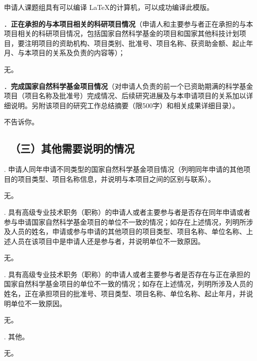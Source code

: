 \documentclass[12pt,UTF8,AutoFakeBold=2,a4paper]{ctexart} %
\newcommand{\sihao}{\fontsize{14pt}{\baselineskip}\selectfont}
\begin{document}
申请人课题组具有可以编译 \LaTeX 的计算机，可以成功编译此模版。

{\sihao \color{MsBlue} ．{\bfseries 正在承担的与本项目相关的科研项目情况}（申请人和主要参与者正在承担的与本项目相关的科研项目情况，包括国家自然科学基金的项目和国家其他科技计划项目，要注明项目的资助机构、项目类别、批准号、项目名称、获资助金额、起止年月、与本项目的关系及负责的内容等）；}

无。

{\sihao \color{MsBlue} ．{\bfseries 完成国家自然科学基金项目情况}（对申请人负责的前一个已资助期满的科学基金项目（项目名称及批准号）完成情况、后续研究进展及与本申请项目的关系加以详细说明。另附该项目的研究工作总结摘要（限500字）和相关成果详细目录）。}

不告诉你。

{\color{MsBlue} \subsection{\sihao \kaishu \quad \ （三）其他需要说明的情况 }}

{\sihao \color{MsBlue} . 申请人同年申请不同类型的国家自然科学基金项目情况（列明同年申请的其他项目的项目类型、项目名称信息，并说明与本项目之间的区别与联系）。 }

无。

{\sihao \color{MsBlue} . 具有高级专业技术职务（职称）的申请人或者主要参与者是否存在同年申请或者参与申请国家自然科学基金项目的单位不一致的情况；如存在上述情况，列明所涉及人员的姓名，申请或参与申请的其他项目的项目类型、项目名称、单位名称、上述人员在该项目中是申请人还是参与者，并说明单位不一致原因。}

无。

{\sihao \color{MsBlue} . 具有高级专业技术职务（职称）的申请人或者主要参与者是否存在与正在承担的国家自然科学基金项目的单位不一致的情况；如存在上述情况，列明所涉及人员的姓名，正在承担项目的批准号、项目类型、项目名称、单位名称、起止年月，并说明单位不一致原因。}

无。

{\sihao \color{MsBlue} . 其他。}

无。
\end{document}
